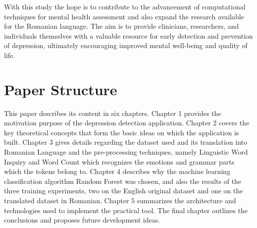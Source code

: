 With this study the hope is to contribute to the advancement of computational techniques for mental health assessment and also expand the research available for the Romanian language. The aim is to provide clinicians, researchers, and individuals themselves with a valuable resource for early detection and prevention of depression, ultimately encouraging improved mental well-being and quality of life.


\section{Paper Structure}

\quad This paper describes its content in six chapters. Chapter 1 provides the motivation  purpose of the depression detection application. Chapter 2 
covers the key theoretical concepts that form the basic ideas on which the application is built. Chapter 3 gives details regarding the dataset used and its translation into Romanian Language and the pre-processing techniques, namely Linguistic Word Inquiry and Word Count which recognizes the emotions and grammar parts which the tokens belong to. Chapter 4 describes why the machine learning classification algorithm Random Forest was chosen, and also the results of the three training experiments, two on the English original dataset and one on the translated dataset in Romanian. 
Chapter 5 summarizes the architecture and technologies used to implement the practical tool. The final chapter outlines the conclusions and proposes future development ideas. 
